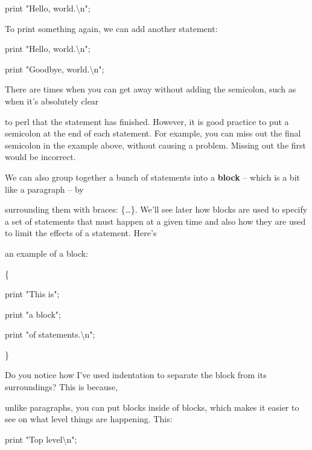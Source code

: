 \documentclass[a4paper,11pt]{book}
\begin{document}
\noindent print "Hello, world.\textbackslash n";

\noindent 

\noindent To print something again, we can add another statement:

\noindent 

\noindent 

\noindent print "Hello, world.\textbackslash n";

\noindent print "Goodbye, world.\textbackslash n";

\noindent 

\noindent There are times when you can get away without adding the semicolon, such as when it's absolutely clear

\noindent to perl that the statement has finished. However, it is good practice to put a semicolon at the end of each statement. For example, you can miss out the final semicolon in the example above, without causing a problem. Missing out the first would be incorrect.

\noindent 

\noindent 

\noindent We can also group together a bunch of statements into a \textbf{block }-- which is a bit like a paragraph -- by

\noindent surrounding them with braces: \{\dots \}. We'll see later how blocks are used to specify a set of statements that must happen at a given time and also how they are used to limit the effects of a statement. Here's

\noindent an example of a block:

\noindent 

\noindent 

\noindent \{

\noindent print "This is";

\noindent print "a block";

\noindent print "of statements.\textbackslash n";

\noindent \}

\noindent 

\noindent Do you notice how I've used indentation to separate the block from its surroundings? This is because,

\noindent unlike paragraphs, you can put blocks inside of blocks, which makes it easier to see on what level things are happening. This:

\noindent 

\noindent 

\noindent print "Top level\textbackslash n";
\end{document}
